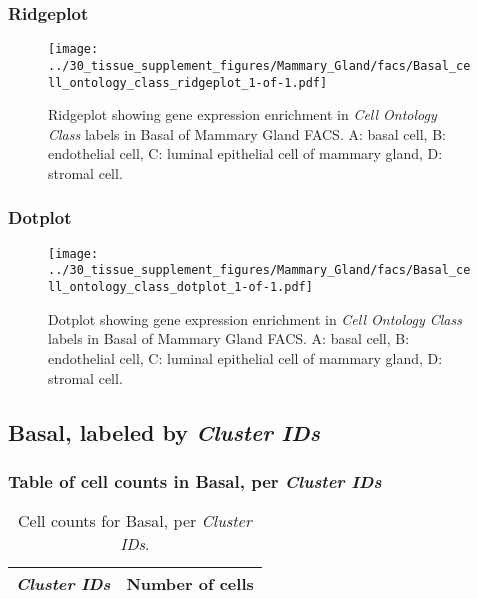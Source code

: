 \clearpage

\subsubsection{Ridgeplot}
\begin{figure}[h]
\centering
\texttt{[image: ../30\_tissue\_supplement\_figures/Mammary\_Gland/facs/Basal\_cell\_ontology\_class\_ridgeplot\_1-of-1.pdf]}

\caption{ Ridgeplot  showing gene expression enrichment in \emph{Cell Ontology Class} labels in Basal of Mammary Gland FACS. A: basal cell, B: endothelial cell, C: luminal epithelial cell of mammary gland, D: stromal cell.}
\end{figure}


\clearpage

\subsubsection{Dotplot}
\begin{figure}[h]
\centering
\texttt{[image: ../30\_tissue\_supplement\_figures/Mammary\_Gland/facs/Basal\_cell\_ontology\_class\_dotplot\_1-of-1.pdf]}

\caption{ Dotplot  showing gene expression enrichment in \emph{Cell Ontology Class} labels in Basal of Mammary Gland FACS. A: basal cell, B: endothelial cell, C: luminal epithelial cell of mammary gland, D: stromal cell.}
\end{figure}


\clearpage

\subsection{Basal, labeled by \emph{Cluster IDs}}
\subsubsection{Table of cell counts in Basal, per \emph{Cluster IDs}}\begin{table}[h]
\centering
\label{my-label}
\begin{tabular}{@{}ll@{}}
\toprule

\emph{Cluster IDs}& Number of cells \\ \midrule\bottomrule
\end{tabular}
\caption{Cell counts for Basal, per \emph{Cluster IDs}.}
\end{table}

